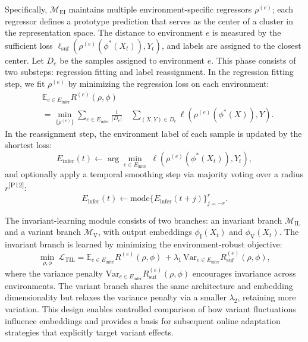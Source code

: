 ﻿\documentclass[journal]{IEEEtran}
\DeclareRobustCommand{\auditbad}[2]{{\color{auditred}#1}{\color{auditred}\textsuperscript{[#2]}}}
\begin{document}
Specifically, $\mathcal{M}_{\mathrm{EI}}$ maintains multiple environment-specific regressors $\rho^{(e)}$; each regressor defines a prototype prediction that serves as the center of a cluster in the representation space. The distance to environment $e$ is measured by the sufficient loss $\ell_{\mathrm{suf}}(\rho^{(e)}(\phi^{*}(X_t)),Y_t)$, and labels are assigned to the closest center. Let $D_e$ be the samples assigned to environment $e$. This phase consists of two substeps: regression fitting and label reassignment. In the regression fitting step, we fit $\rho^{(e)}$ by minimizing the regression loss on each environment:
\begin{equation}
\begin{aligned}
&\mathbb{E}_{e\in E_{\mathrm{infer}}}R^{(e)}(\rho,\phi) \\
&= \min_{\{\rho^{(e)}\}}\sum_{e\in E_{\mathrm{infer}}}\frac{1}{|D_e|}
\quad \sum_{(X,Y)\in D_e}\ell\!\left(\rho^{(e)}(\phi^{*}(X)),Y\right).
\end{aligned}
\end{equation}
In the reassignment step, the environment label of each sample is updated by the shortest loss:
\begin{equation}
E_{\mathrm{infer}}(t)\leftarrow \arg\min_{e\in E_{\mathrm{infer}}}\ \ell\!\left(\rho^{(e)}(\phi^{*}(X_t)),Y_t\right),
\end{equation}
and optionally apply a \auditbad{temporal smoothing step via majority voting over a radius $r$}{P12}:
\begin{equation}
E_{\mathrm{infer}}(t)\leftarrow \mathrm{mode}\{E_{\mathrm{infer}}(t+j)\}_{j=-r}^{r}.
\end{equation}

The invariant-learning module consists of two branches: an invariant branch $\mathcal{M}_{\mathrm{IL}}$ and a variant branch $\mathcal{M}_{\mathrm{V}}$, with output embeddings $\phi_{\mathrm{I}}(X_t)$ and $\phi_{\mathrm{V}}(X_t)$. The invariant branch is learned by minimizing the environment-robust objective:
\begin{equation}
\min_{\rho,\phi}\ \mathcal{L}_{\mathrm{TIL}}
=\mathbb{E}_{e\in E_{\mathrm{infer}}}R^{(e)}(\rho,\phi)
\,+\lambda_1\,\mathrm{Var}_{e\in E_{\mathrm{infer}}} R_{\mathrm{suf}}^{(e)}(\rho,\phi),
\end{equation}
where the variance penalty $\mathrm{Var}_{e\in E_{\mathrm{infer}}} R_{\mathrm{suf}}^{(e)}(\rho,\phi)$ encourages invariance across environments. The variant branch shares the same architecture and embedding dimensionality but relaxes the variance penalty via a smaller $\lambda_2$, retaining more variation. This design enables controlled comparison of how variant fluctuations influence embeddings and provides a basis for subsequent online adaptation strategies that explicitly target variant effects. 
\end{document}
